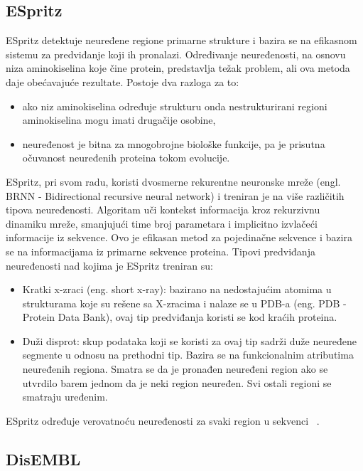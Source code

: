 \subsection{ESpritz}
ESpritz detektuje neuređene regione primarne strukture i bazira se na efikasnom sistemu za predviđanje koji ih pronalazi. Određivanje neuređenosti, na osnovu niza aminokiselina koje čine protein, predstavlja težak problem, ali ova metoda daje obećavajuće rezultate. Postoje dva razloga za to:
\begin{itemize}
\item  ako niz aminokiselina određuje strukturu onda nestrukturirani regioni aminokiselina mogu imati drugačije osobine, 
\item neuređenost je bitna za mnogobrojne biološke funkcije, pa je prisutna očuvanost neuređenih proteina tokom evolucije. 
\end{itemize}

ESpritz, pri svom radu, koristi dvosmerne rekurentne neuronske mreže (engl. BRNN - Bidirectional recursive neural network) i treniran je na više različitih tipova neuređenosti. Algoritam uči kontekst informacija kroz rekurzivnu dinamiku mreže, smanjujući time broj parametara i implicitno izvlačeći informacije iz sekvence. Ovo je efikasan metod za pojedinačne sekvence i bazira se na informacijama iz primarne sekvence proteina. Tipovi predviđanja neuređenosti nad kojima je ESpritz treniran su:
\begin{itemize}
\item Kratki x-zraci (eng. short x-ray): bazirano na nedostajućim atomima u strukturama koje su rešene sa X-zracima i nalaze se u PDB-a (eng. PDB - Protein Data Bank), ovaj tip predviđanja koristi se kod kraćih proteina. 
\item Duži disprot: skup podataka koji se koristi za ovaj tip sadrži duže neuređene segmente u odnosu na prethodni tip. Bazira se na funkcionalnim atributima neuređenih regiona. Smatra se da je pronađen neuređeni region ako se utvrdilo barem jednom da je neki region neuređen. Svi ostali regioni se smatraju uređenim.
\end{itemize}
ESpritz određuje verovatnoću neuređenosti za svaki region u sekvenci ~\cite{ESpritzAFPD, ESpritzEP, ESpritz2, ESpritz3}.

\subsection{DisEMBL}

